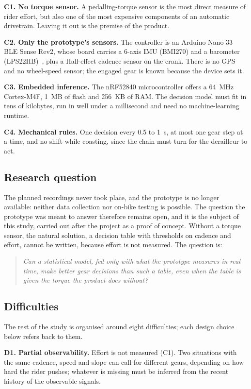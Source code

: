 \documentclass[conference]{IEEEtran}
\begin{document}
\textbf{C1. No torque sensor.} A pedalling-torque sensor is the most direct measure of rider effort, but also one of the most expensive components of an automatic drivetrain. Leaving it out is the premise of the product.

\textbf{C2. Only the prototype's sensors.} The controller is an Arduino Nano 33 BLE Sense Rev2, whose board carries a 6-axis IMU (BMI270) and a barometer (LPS22HB)~\cite{nano}, plus a Hall-effect cadence sensor on the crank. There is no GPS and no wheel-speed sensor; the engaged gear is known because the device sets it.

\textbf{C3. Embedded inference.} The nRF52840 microcontroller offers a 64~MHz Cortex-M4F, 1~MB of flash and 256~KB of RAM. The decision model must fit in tens of kilobytes, run in well under a millisecond and need no machine-learning runtime.

\textbf{C4. Mechanical rules.} One decision every 0.5 to 1~s, at most one gear step at a time, and no shift while coasting, since the chain must turn for the derailleur to act.

\subsection{Research question}\label{sec:question}
The planned recordings never took place, and the prototype is no longer available: neither data collection nor on-bike testing is possible. The question the prototype was meant to answer therefore remains open, and it is the subject of this study, carried out after the project as a proof of concept. Without a torque sensor, the natural solution, a decision table with thresholds on cadence and effort, cannot be written, because effort is not measured. The question is:

\begin{quote}
\emph{Can a statistical model, fed only with what the prototype measures in real time, make better gear decisions than such a table, even when the table is given the torque the product does without?}
\end{quote}

\subsection{Difficulties}\label{sec:difficulties}
The rest of the study is organised around eight difficulties; each design choice below refers back to them.

\textbf{D1. Partial observability.} Effort is not measured (C1). Two situations with the same cadence, speed and slope can call for different gears, depending on how hard the rider pushes; whatever is missing must be inferred from the recent history of the observable signals.
\end{document}
